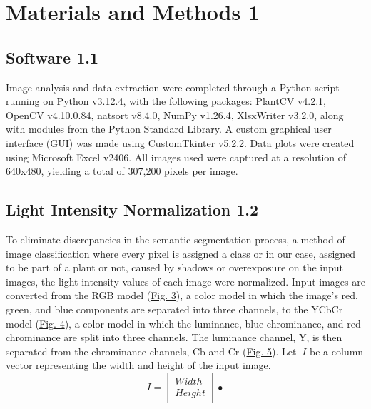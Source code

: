 \documentclass[12pt]{article}
\begin{document}
\section*{Materials and Methods 1}
\subsection*{Software 1.1}
\hspace{1cm}Image analysis and data extraction were completed through a Python script running on Python v3.12.4, with the following packages: PlantCV v4.2.1, OpenCV v4.10.0.84, natsort v8.4.0, NumPy v1.26.4, XlsxWriter v3.2.0, along with modules from the Python Standard Library. A custom graphical user interface (GUI) was made using CustomTkinter v5.2.2. Data plots were created using Microsoft Excel v2406. All images used were captured at a resolution of 640x480, yielding a total of 307,200 pixels per image.

\subsection*{Light Intensity Normalization 1.2}
\hspace{1cm}To eliminate discrepancies in the semantic segmentation process, a method of image classification where every pixel is assigned a class or in our case, assigned to be part of a plant or not, caused by shadows or overexposure on the input images, the light intensity values of each image were normalized. Input images are converted from the RGB model (\hyperref[fig:species_rgb]{Fig. 3}), a color model in which the image's red, green, and blue components are separated into three channels, to the YCbCr model (\hyperref[fig:species_ycrcb]{Fig. 4}), a color model in which the luminance, blue chrominance, and red chrominance are split into three channels. The luminance channel, Y, is then separated from the chrominance channels, Cb and Cr (\hyperref[fig:species_Y]{Fig. 5}). Let \(\ I \) be a column vector representing the width and height of the input image.
\begin{equation}
I = \begin{bmatrix}
Width\\
Height
\end{bmatrix}•
\end{equation}
\end{document}
